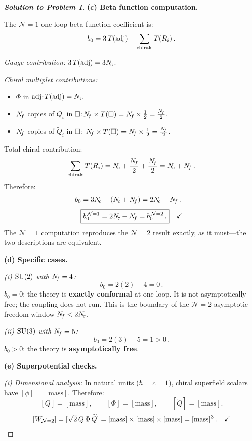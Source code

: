 \documentclass[11pt,a4paper]{article}
\begin{document}
\begin{proof}[\textbf{Solution to Problem 1}]
\bigskip

\textbf{(c) Beta function computation.}

The $\mathcal{N}=1$ one-loop beta function coefficient is:
\[
  b_0 = 3\,T(\mathrm{adj}) - \sum_{\text{chirals}} T(R_i)\,.
\]

\textit{Gauge contribution:} $3\,T(\mathrm{adj}) = 3N_{\!c}$.

\textit{Chiral multiplet contributions:}
\begin{itemize}
  \item $\Phi$ in $\mathrm{adj}$:\quad $T(\mathrm{adj}) = N_{\!c}$.
  \item $N_{\!f}$ copies of $Q_i$ in $\square$:\quad $N_{\!f} \times T(\square)
    = N_{\!f} \times \frac{1}{2} = \frac{N_{\!f}}{2}$.
  \item $N_{\!f}$ copies of $\widetilde{Q}_i$ in $\overline{\square}$:\quad
    $N_{\!f} \times T(\overline{\square}) = N_{\!f} \times \frac{1}{2} = \frac{N_{\!f}}{2}$.
\end{itemize}
Total chiral contribution:
\[
  \sum_{\text{chirals}} T(R_i)
  = N_{\!c} + \frac{N_{\!f}}{2} + \frac{N_{\!f}}{2}
  = N_{\!c} + N_{\!f}\,.
\]
Therefore:
\begin{align}
  b_0 &= 3N_{\!c} - (N_{\!c} + N_{\!f}) = 2N_{\!c} - N_{\!f}\,.
\end{align}
\[
  \boxed{b_0^{\,\mathcal{N}=1} = 2N_{\!c} - N_{\!f}
  = b_0^{\,\mathcal{N}=2}\,.}
  \quad\checkmark
\]
The $\mathcal{N}=1$ computation reproduces the $\mathcal{N}=2$ result
exactly, as it must---the two descriptions are equivalent.

\bigskip

\textbf{(d) Specific cases.}

\textit{(i) $\mathrm{SU}(2)$ with $N_{\!f} = 4$:}
\[
  b_0 = 2(2) - 4 = 0\,.
\]
$b_0 = 0$: the theory is \textbf{exactly conformal} at one loop.
It is not asymptotically free; the coupling does not run.  This is the
boundary of the $\mathcal{N}=2$ asymptotic freedom window
$N_{\!f} < 2N_{\!c}$.

\textit{(ii) $\mathrm{SU}(3)$ with $N_{\!f} = 5$:}
\[
  b_0 = 2(3) - 5 = 1 > 0\,.
\]
$b_0 > 0$: the theory is \textbf{asymptotically free}.

\bigskip

\textbf{(e) Superpotential checks.}

\textit{(i) Dimensional analysis:}
In natural units ($\hbar = c = 1$), chiral superfield scalars have
$[\phi] = [\mathrm{mass}]$.  Therefore:
\[
  [Q] = [\mathrm{mass}],\qquad [\Phi] = [\mathrm{mass}],\qquad
  [\widetilde{Q}] = [\mathrm{mass}].
\]
\[
  [W_{\mathcal{N}=2}]
  = [\sqrt{2}\, Q\, \Phi\, \widetilde{Q}]
  = [\mathrm{mass}] \times [\mathrm{mass}] \times [\mathrm{mass}]
  = [\mathrm{mass}]^3\,.
  \quad\checkmark
\]


\end{proof}
\end{document}
